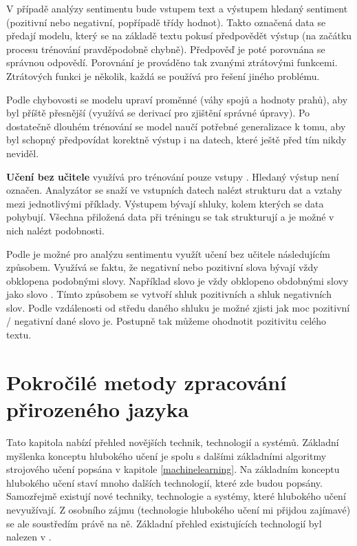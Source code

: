 V případě analýzy sentimentu bude vstupem text a výstupem hledaný sentiment (pozitivní nebo negativní, popřípadě třídy hodnot). Takto označená data se předají modelu, který se na základě textu pokusí předpovědět výstup (na začátku procesu trénování pravděpodobně chybně). Předpověď je poté porovnána se správnou odpovědí. Porovnání je prováděno tak zvanými ztrátovými funkcemi. Ztrátových funkci je několik, každá se používá pro řešení jiného problému.


Podle chybovosti se modelu upraví proměnné (váhy spojů a hodnoty prahů), aby byl příště přesnější (využívá se derivací pro zjištění správné úpravy). Po dostatečně dlouhém trénování se model naučí potřebné generalizace k tomu, aby byl schopný předpovídat korektně výstup i na datech, které ještě před tím nikdy neviděl.
 
\textbf{Učení bez učitele} využívá pro trénování pouze vstupy \cite{machinelearning}. Hledaný výstup není označen. Analyzátor se snaží ve vstupních datech nalézt strukturu dat a vztahy mezi jednotlivými příklady. Výstupem bývají shluky, kolem kterých se data pohybují. Všechna přiložená data při tréningu se tak strukturují a je možné v nich nalézt podobnosti. 

Podle \cite{unsupervised} je možné pro analýzu sentimentu využít učení bez učitele následujícím způsobem. Využívá se faktu, že negativní nebo pozitivní slova bývají vždy obklopena podobnými slovy. Například slovo  je vždy obklopeno obdobnými slovy jako slovo . Tímto způsobem se vytvoří shluk pozitivních a shluk negativních slov. Podle vzdálenosti od středu daného shluku je možné zjisti jak moc pozitivní / negativní dané slovo je. Postupně tak můžeme ohodnotit pozitivitu celého textu.



\section{Pokročilé metody zpracování přirozeného jazyka}
Tato kapitola nabízí přehled novějších technik, technologií a systémů. Základní myšlenka konceptu hlubokého učení je spolu s dalšími základními algoritmy strojového učení popsána v kapitole \ref{machinelearning}. Na základním konceptu hlubokého učení staví mnoho dalších technologií, které zde budou popsány. Samozřejmě existují nové techniky, technologie a systémy, které hlubokého učení nevyužívají. Z osobního zájmu (technologie hlubokého učení mi přijdou zajímavé) se ale soustředím právě na ně. Základní přehled existujících technologií byl nalezen v \cite{survey}.


